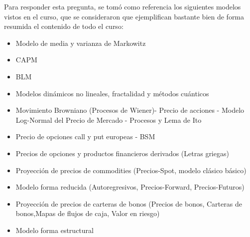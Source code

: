 




\begin{cajita}
    Para responder esta pregunta, se tomó como referencia los siguientes modelos vistos en el curso, que se consideraron que ejemplifican bastante bien de forma resumida el contenido de todo el curso: 
    \begin{itemize}
        \item Modelo de media y varianza de Markowitz 
        \item CAPM
        \item BLM
        \item Modelos dinámicos no lineales, fractalidad y
        métodos cuánticos
        \item Movimiento Browniano (Procesos de Wiener)- Precio de acciones - Modelo Log-Normal del Precio de Mercado - Procesos y Lema de Ito 
        \item Precio de opciones call y put europeas - BSM
        \item Precios de opciones y productos financieros derivados (Letras griegas)
        \item Proyección de precios de commodities (Precios-Spot, modelo clásico básico) 
        \item Modelo forma reducida (Autoregresivos, Precios-Forward, Precios-Futuros)
        \item Proyección de precios de carteras de bonos (Precios de bonos, Carteras de bonos,Mapas de flujos de caja, Valor en riesgo) 
        \item Modelo forma estructural 

    \end{itemize}
\end{cajita}
